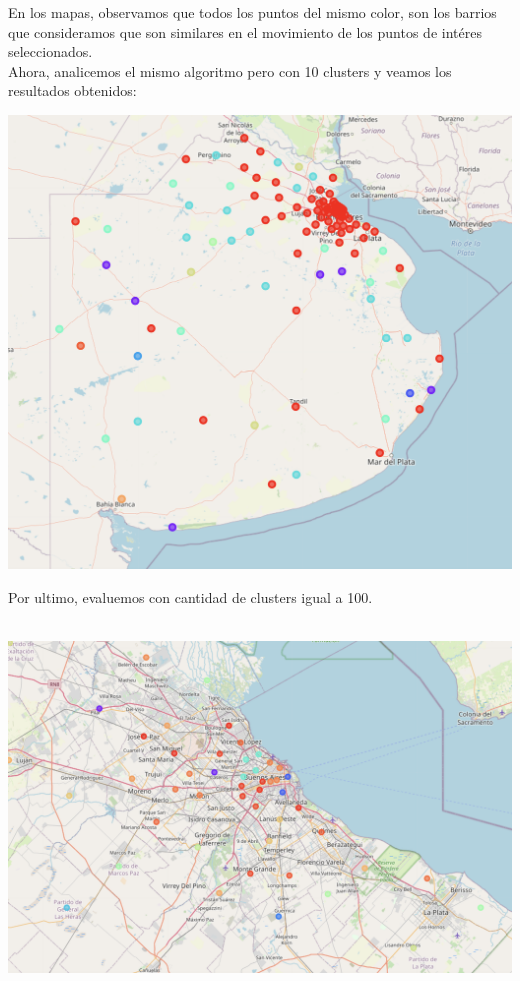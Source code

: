 \documentclass[12pt,a4paper]{tesis}
\begin{document}
En los mapas, observamos que todos los puntos del mismo color, son los barrios que consideramos que son similares en el movimiento de los puntos de intéres seleccionados. \\

Ahora, analicemos el mismo algoritmo pero con 10 clusters y veamos los resultados obtenidos:

\centerline{
	\includegraphics[scale=0.5]{mapa8}
}

\newpage
Por ultimo, evaluemos con cantidad de clusters igual a 100. \\ \\


\centerline{
	\includegraphics[scale=0.45]{mapa9}
}
\end{document}
